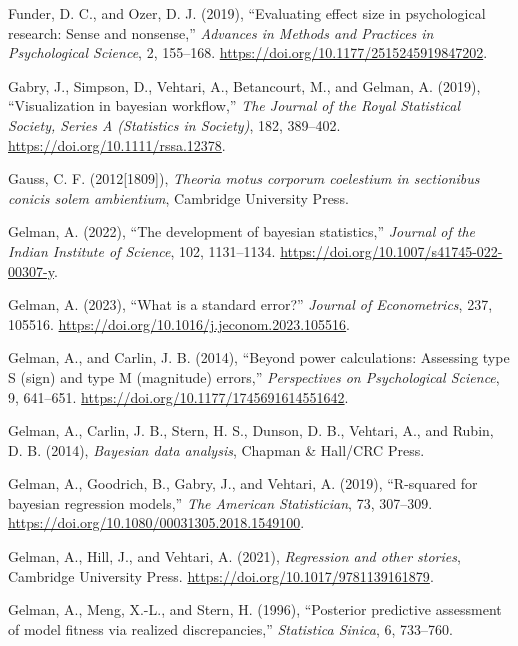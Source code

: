 \documentclass[
  10pt,
  a4paper,
  twoside]{article}
\newlength{\cslhangindent}
\newenvironment{CSLReferences}[2] %
 {\begin{list}{}{%
  \setlength{\itemindent}{0pt}
  \setlength{\leftmargin}{0pt}
  \setlength{\parsep}{0pt}
  \ifodd #1
   \setlength{\leftmargin}{\cslhangindent}
   \setlength{\itemindent}{-1\cslhangindent}
  \fi
  \setlength{\itemsep}{#2\baselineskip}}}
 {\end{list}}
\begin{document}
\begin{CSLReferences}{1}{0}
Funder, D. C., and Ozer, D. J. (2019), {``Evaluating effect size in psychological research: Sense and nonsense,''} \emph{Advances in Methods and Practices in Psychological Science}, 2, 155--168. \url{https://doi.org/10.1177/2515245919847202}.

Gabry, J., Simpson, D., Vehtari, A., Betancourt, M., and Gelman, A. (2019), {``Visualization in bayesian workflow,''} \emph{The Journal of the Royal Statistical Society, Series A (Statistics in Society)}, 182, 389--402. \url{https://doi.org/10.1111/rssa.12378}.

Gauss, C. F. (2012{[}1809{]}), \emph{Theoria motus corporum coelestium in sectionibus conicis solem ambientium}, Cambridge University Press.

Gelman, A. (2022), {``The development of bayesian statistics,''} \emph{Journal of the Indian Institute of Science}, 102, 1131--1134. \url{https://doi.org/10.1007/s41745-022-00307-y}.

Gelman, A. (2023), {``What is a standard error?''} \emph{Journal of Econometrics}, 237, 105516. \url{https://doi.org/10.1016/j.jeconom.2023.105516}.

Gelman, A., and Carlin, J. B. (2014), {``Beyond power calculations: Assessing type {S} (sign) and type {M} (magnitude) errors,''} \emph{Perspectives on Psychological Science}, 9, 641--651. \url{https://doi.org/10.1177/1745691614551642}.

Gelman, A., Carlin, J. B., Stern, H. S., Dunson, D. B., Vehtari, A., and Rubin, D. B. (2014), \emph{Bayesian data analysis}, Chapman \& Hall/CRC Press.

Gelman, A., Goodrich, B., Gabry, J., and Vehtari, A. (2019), {``R-squared for bayesian regression models,''} \emph{The American Statistician}, 73, 307--309. \url{https://doi.org/10.1080/00031305.2018.1549100}.

Gelman, A., Hill, J., and Vehtari, A. (2021), \emph{Regression and other stories}, Cambridge University Press. \url{https://doi.org/10.1017/9781139161879}.

Gelman, A., Meng, X.-L., and Stern, H. (1996), {``Posterior predictive assessment of model fitness via realized discrepancies,''} \emph{Statistica Sinica}, 6, 733--760.


\end{CSLReferences}
\end{document}
